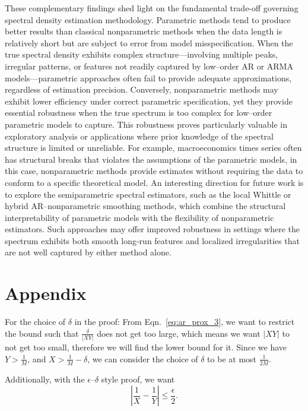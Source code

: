 \documentclass[preprint]{aastex}
\theoremstyle{nonitalicname}
\theoremstyle{plain}
\theoremstyle{remark}
\begin{document}
These complementary findings shed light on the fundamental trade-off governing spectral density estimation methodology. Parametric methods tend to produce better results than classical nonparametric methods when the data length is relatively short but are subject to error from model misspecification. When the true spectral density exhibits complex structure—involving multiple peaks, irregular patterns, or features not readily captured by low--order AR or ARMA models—parametric approaches often fail to provide adequate approximations, regardless of estimation precision. Conversely, nonparametric methods may exhibit lower efficiency under correct parametric specification, yet they provide essential robustness when the true spectrum is too complex for low--order parametric models to capture. This robustness proves particularly valuable in exploratory analysis or applications where prior knowledge of the spectral structure is limited or unreliable. For example, macroeconomics times series often has structural breaks that violates the assumptions of the parametric models, in this case, nonparametric methods provide estimates without requiring the data to conform to a specific theoretical model. An interesting direction for future work is to explore the semiparametric spectral estimators, such as the local Whittle or hybrid AR–nonparametric smoothing methods, which combine the structural interpretability of parametric models with the flexibility of nonparametric estimators. Such approaches may offer improved robustness in settings where the spectrum exhibits both smooth long-run features and localized irregularities that are not well captured by either method alone.



\newpage

\section{Appendix}
For the choice of $\delta$ in the proof:
From Eqn.~\ref{eq:ar_prox_3}, we want to restrict the bound such that $\frac{\delta}{|XY|}$ does not get too large, which means we want $|XY|$ to not get too small, therefore we will find the lower bound for it. 
Since we have $Y > \frac{1}{M}$, and $X >  \frac{1}{M} - \delta$, we can consider the choice of $\delta$ to be at most $\frac{1}{2M}$. 

Additionally, with the $\epsilon$--$\delta$ style proof, we want
\begin{equation}\label{eq:eps_condition}
\left| \frac{1}{X} - \frac{1}{Y} \right| \leq \frac{\epsilon}{2}.
\end{equation}
\end{document}
